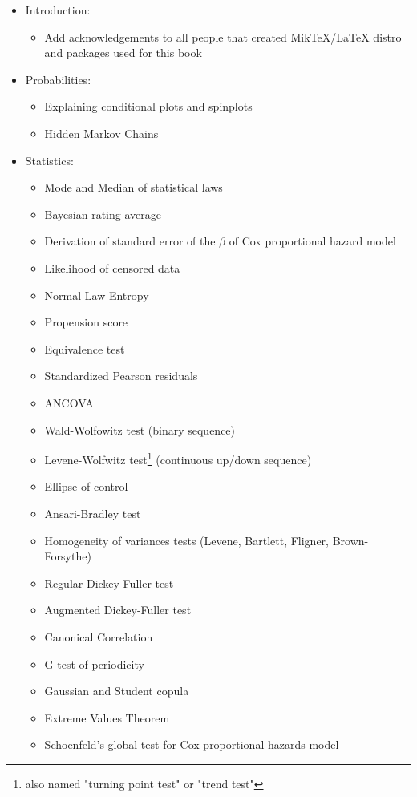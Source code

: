 	\begin{itemize}
		\item Introduction:
			\begin{itemize}
				\item Add acknowledgements to all people that created MikTeX/LaTeX distro and packages used for this book
			\end{itemize}
		\item Probabilities:
			\begin{itemize}
				\item Explaining conditional plots and spinplots
				\item Hidden Markov Chains
			\end{itemize}
		\item Statistics: 
			\begin{itemize}
				\item Mode and Median of statistical laws	
				\item Bayesian rating average
				\item Derivation of standard error of the $\beta$ of Cox proportional hazard model		
				\item Likelihood of censored data
				\item Normal Law Entropy
				\item Propension score
				\item Equivalence test
				\item Standardized Pearson residuals
				\item ANCOVA
				\item Wald-Wolfowitz test (binary sequence)
				\item Levene-Wolfwitz test\footnote{also named "turning point test" or "trend test"} (continuous up/down sequence)
				\item Ellipse of control
				\item Ansari-Bradley test
				\item Homogeneity of variances tests (Levene, Bartlett, Fligner,  Brown-Forsythe)
				\item Regular Dickey-Fuller test
				\item Augmented Dickey-Fuller test
				\item Canonical Correlation
				\item G-test of periodicity
				\item Gaussian and Student copula
				\item Extreme Values Theorem
				\item Schoenfeld’s global test for Cox proportional hazards model

\end{itemize}
\end{itemize}
